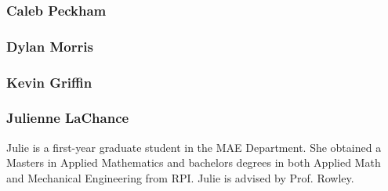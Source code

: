 \subsubsection*{Caleb Peckham}

\subsubsection*{Dylan Morris}

\subsubsection*{Kevin Griffin}

\subsubsection*{Julienne La\+Chance}

Julie is a first-\/year graduate student in the M\+AE Department. She obtained a Master\textquotesingle{}s in Applied Mathematics and bachelors degrees in both Applied Math and Mechanical Engineering from R\+PI. Julie is advised by Prof. Rowley. 